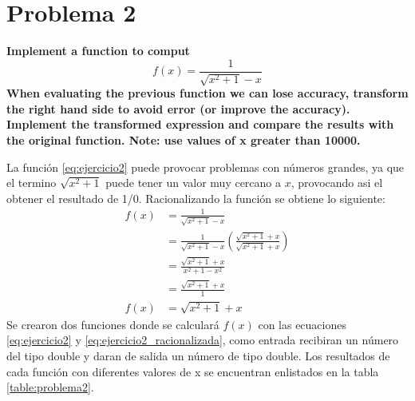 \section*{Problema 2}
\textbf{Implement a function to comput
    \begin{equation}
        f(x)=\frac{1}{\sqrt{x^2+1}-x}
        \label{eq:ejercicio2}
    \end{equation}
    When evaluating the previous function we can lose accuracy, transform the right hand side to avoid error (or improve the accuracy). Implement the transformed expression and compare the results with the original function. Note: use values of x greater than 10000.}

La función \ref{eq:ejercicio2} puede provocar problemas con números grandes, ya que el termino $\sqrt{x^2+1}$ puede tener un valor muy cercano a $x$, provocando asi el obtener el resultado de 1/0. Racionalizando la función se obtiene lo siguiente:
\begin{align}
    f(x) & = \frac{1}{\sqrt{x^2+1}-x}                                                     \nonumber \\
         & = \frac{1}{\sqrt{x^2+1}-x} \left(\frac{\sqrt{x^2+1}+x}{\sqrt{x^2+1}+x} \right) \nonumber \\
         & = \frac{\sqrt{x^2+1}+x}{x^2+1-x^2}                                             \nonumber \\
         & = \frac{\sqrt{x^2+1}+x}{1}                                                     \nonumber \\
    f(x) & = \sqrt{x^2+1}+x \label{eq:ejercicio2_racionalizada}
\end{align}
Se crearon dos funciones donde se calculará $f(x)$ con las ecuaciones \ref{eq:ejercicio2} y \ref{eq:ejercicio2_racionalizada}, como entrada recibiran un número del tipo double y daran de salida un número de tipo double. Los resultados de cada función con diferentes valores de x se encuentran enlistados en la tabla \ref{table:problema2}.
